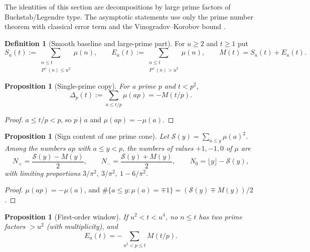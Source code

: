 \documentclass[11pt]{amsart}
\numberwithin{equation}{section}
\theoremstyle{plain}
\newtheorem{proposition}[theorem]{Proposition}
\theoremstyle{definition}
\newtheorem{definition}[theorem]{Definition}
\theoremstyle{remark}
\newcommand{\Pp}{P^{+}}
\newcommand{\Sq}{\mathcal{S}}
\begin{document}
The identities of this section are decompositions by large prime factors of
Buchstab/Legendre type. The asymptotic statements use only the prime number
theorem with classical error term and the Vinogradov--Korobov bound
\cite{MontgomeryVaughan2007,Walfisz1963}.

\begin{definition}[Smooth baseline and large-prime part]
\label{def:baseline_channel}
For $u\ge2$ and $t\ge1$ put
\begin{equation}
\label{eq:baseline_channel_def}
  S_u(t):=\sum_{\substack{n\le t\\ \Pp(n)\le u^2}}\mu(n),\qquad
  E_u(t):=\sum_{\substack{n\le t\\ \Pp(n)>u^2}}\mu(n),\qquad
  M(t)=S_u(t)+E_u(t).
\end{equation}
\end{definition}

\begin{proposition}[Single-prime copy]
\label{prop:single_prime_copy}
For a prime $p$ and $t<p^2$,
\begin{equation}
\label{eq:single-prime-copy}
  \Delta_p(t):=\sum_{a\le t/p}\mu(ap)=-M(t/p).
\end{equation}
\end{proposition}

\begin{proof}
$a\le t/p<p$, so $p\nmid a$ and $\mu(ap)=-\mu(a)$.
\end{proof}

\begin{proposition}[Sign content of one prime cone]
\label{prop:prime-cone-signs}
Let $\Sq(y)=\sum_{a\le y}\mu(a)^2$. Among the numbers $ap$ with $a\le y<p$,
the numbers of values $+1,-1,0$ of $\mu$ are
\begin{equation}
\label{eq:cone_counts}
  N_+=\frac{\Sq(y)-M(y)}{2},\qquad N_-=\frac{\Sq(y)+M(y)}{2},\qquad
  N_0=\lfloor y\rfloor-\Sq(y),
\end{equation}
with limiting proportions $3/\pi^2,\ 3/\pi^2,\ 1-6/\pi^2$.
\end{proposition}

\begin{proof}
$\mu(ap)=-\mu(a)$, and $\#\{a\le y:\mu(a)=\mp1\}=(\Sq(y)\mp M(y))/2$.
\end{proof}

\begin{proposition}[First-order window]
\label{prop:linear-new-primes}
If $u^2<t<u^4$, no $n\le t$ has two prime factors $>u^2$ (with
multiplicity), and
\begin{equation}
\label{eq:first-order-total}
  E_u(t)=-\sum_{u^2<p\le t}M(t/p).
\end{equation}
\end{proposition}
\end{document}
